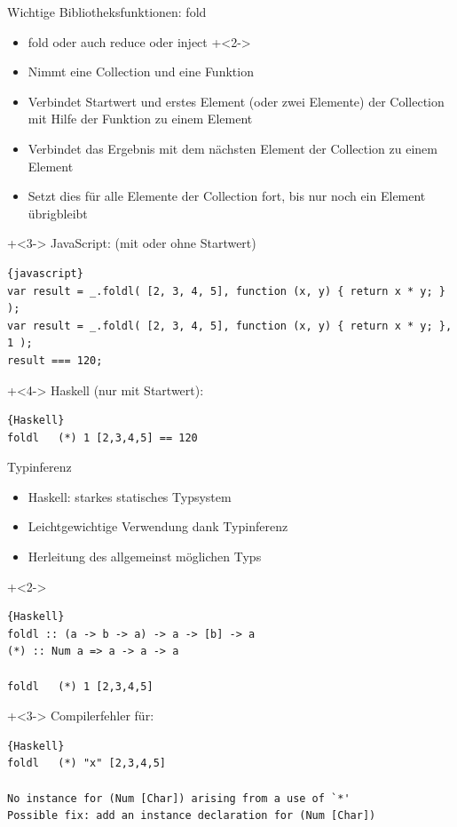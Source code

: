 \begin{frame}[fragile]{Wichtige Bibliotheksfunktionen: fold}
\begin{itemize}
\item fold oder auch reduce oder inject
\onslide+<2->
\item Nimmt eine Collection und eine Funktion
\item Verbindet Startwert und erstes Element (oder zwei Elemente) der Collection mit Hilfe der Funktion zu einem Element
\item Verbindet das Ergebnis mit dem nächsten Element der Collection zu einem Element
\item Setzt dies für alle Elemente der Collection fort, bis nur noch ein Element übrigbleibt
\end{itemize}

\onslide+<3->
JavaScript: (mit oder ohne Startwert)
\begin{lstlisting}{javascript}
var result = _.foldl( [2, 3, 4, 5], function (x, y) { return x * y; } );
var result = _.foldl( [2, 3, 4, 5], function (x, y) { return x * y; }, 1 );
result === 120;
\end{lstlisting}
\onslide+<4->
Haskell (nur mit Startwert):
\begin{lstlisting}{Haskell}
foldl	(*) 1 [2,3,4,5] == 120
\end{lstlisting}

\end{frame}

\begin{frame}[fragile]{Typinferenz}
\begin{itemize}
\item Haskell: starkes statisches Typsystem
\item Leichtgewichtige Verwendung dank Typinferenz
\item Herleitung des allgemeinst möglichen Typs
\end{itemize}

\onslide+<2->
\begin{lstlisting}{Haskell}
foldl :: (a -> b -> a) -> a -> [b] -> a
(*) :: Num a => a -> a -> a

foldl	(*) 1 [2,3,4,5]
\end{lstlisting}

\vfill

\onslide+<3->
Compilerfehler für:
\begin{lstlisting}{Haskell}
foldl	(*) "x" [2,3,4,5]

No instance for (Num [Char]) arising from a use of `*'
Possible fix: add an instance declaration for (Num [Char])
\end{lstlisting}

\end{frame}


